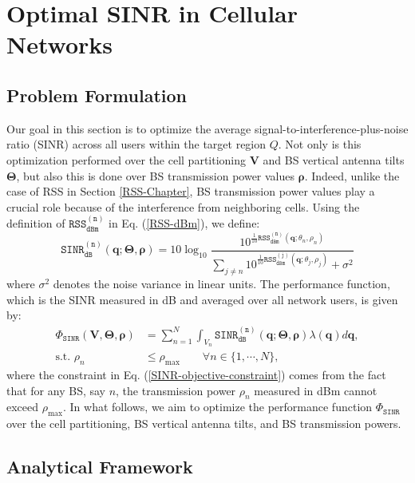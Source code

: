 \section{Optimal SINR in Cellular Networks}\label{SINR-Chapter}


\subsection{Problem Formulation}\label{SINR-Problem-Formulation}

Our goal in this section is to optimize the average signal-to-interference-plus-noise ratio (SINR) across all users within the target region $Q$. Not only is this optimization performed over the cell partitioning $\bm{V}$ and BS vertical antenna tilts $\bm{\Theta}$, but also this is done over BS transmission power values $\bm{\rho}$. Indeed, unlike the case of RSS in Section \ref{RSS-Chapter}, BS transmission power values play a crucial role because of the interference from neighboring cells. Using the definition of $\mathtt{RSS_{dBm}^{(n)}}$ in Eq. (\ref{RSS-dBm}), we define:
\begin{equation}\label{eqn:SINR_dB}
\mathtt{SINR^{(n)}_{dB}} (\bm{q}; \mathbf{\Theta}, \bm{\rho}) = 10 \log_{10} \frac{10^{\frac{1}{10}\mathtt{RSS^{(n)}_{dBm}} (\bm{q}; \theta_n, \rho_n)}}{\sum_{j\neq n}^{} 10^{\frac{1}{10}\mathtt{RSS^{(j)}_{dBm}} (\bm{q}; \theta_j, \rho_j)} + \sigma^2}  
\end{equation}
where $\sigma^2$ denotes the noise variance in linear units. The performance function, which is the SINR measured in dB and averaged over all network users, is given by:
\begin{align}\label{SINR-objective}
    \Phi_{\mathtt{SINR}}(\bm{V}, \mathbf{\Theta}, \bm{\rho}) &=  \sum_{n=1}^{N} \int_{V_n} \mathtt{SINR_{dB}^{(n)}}(\bm{q}; \mathbf{\Theta}, \bm{\rho}) \lambda(\bm{q}) d\bm{q}, \\
    \textrm{s.t. } \rho_n &\leq \rho_{\max} \qquad \forall n\in\{1,\cdots, N\}, \label{SINR-objective-constraint}
\end{align}
where the constraint in Eq. (\ref{SINR-objective-constraint}) comes from the fact that for any BS, say $n$, the transmission power $\rho_n$ measured in dBm cannot exceed $\rho_{\max}$. In what follows, we aim to optimize the performance function $\Phi_{\mathtt{SINR}}$ over the cell partitioning, BS vertical antenna tilts, and BS transmission powers.




\subsection{Analytical Framework}\label{SINR-Analytical-Framework}

